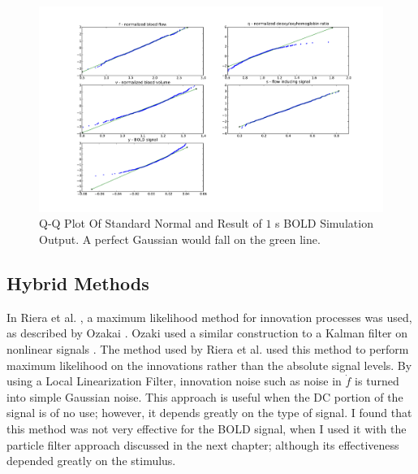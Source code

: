 \begin{figure}
\includegraphics[trim=6cm .75cm 6cm .75cm,width=16cm]{images/gauss_step_1sec_3sigma.pdf}
\caption[Q-Q Plot Of Standard Normal and Result of $1$ s \ac{BOLD} Simulation Output]
{Q-Q Plot Of Standard Normal and Result of $1$ s \ac{BOLD} Simulation Output. A
perfect Gaussian would fall on the green line.}
\label{fig:trans1s}
\end{figure}

\subsection{Hybrid Methods}
In Riera et al. \cite{Riera2003}, a maximum
likelihood method for innovation processes was used, as described by
Ozakai \cite{Ozaki1994}. Ozaki \cite{Ozaki1994} used a similar construction to a 
Kalman filter on nonlinear signals \cite{Ozaki1994}. 
The method used by Riera et al.\cite{Riera2003} used this method to 
perform maximum likelihood on
the innovations rather than the absolute signal levels. 
By using a Local Linearization Filter,
innovation noise such as noise in $\dot{f}$ is turned into simple 
Gaussian noise. This approach is useful when the \ac{DC} portion of the signal is
of no use; however, it depends greatly on the type of signal. I found that
this method was not very effective for the \ac{BOLD} signal, when I used it 
with the particle filter approach discussed in the next chapter; although its
effectiveness depended greatly on the stimulus.

